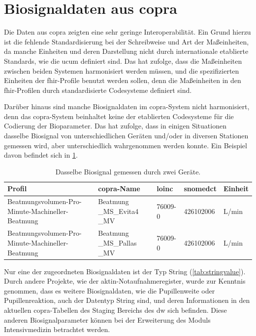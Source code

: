 \section{Biosignaldaten aus \acs{copra}} \label{sec:configvarcopradiscu}

Die Daten aus \ac{copra} zeigten eine sehr geringe Interoperabilität. Ein Grund hierzu ist die fehlende Standardisierung bei der Schreibweise und Art der Maßeinheiten, da manche Einheiten und deren Darstellung nicht durch internationale etablierte Standards, wie die \ac{ucum} definiert sind. Das hat zufolge, dass die Maßeinheiten zwischen beiden Systemen harmonisiert werden müssen, und die spezifizierten Einheiten der \ac{fhir}-Profile benutzt werden sollen, denn die Maßeinheiten in den \ac{fhir}-Profilen durch standardisierte Codesysteme definiert sind. 

Darüber hinaus sind manche Biosignaldaten im \ac{copra}-System nicht harmonisiert, denn das \ac{copra}-System beinhaltet keine der etablierten Codesysteme für die Codierung der Bioparameter. Das hat zufolge, dass in einigen Situationen dasselbe Biosignal von unterschiedlichen Geräten und/oder in diversen Stationen gemessen wird, aber unterschiedlich wahrgenommen werden konnte. Ein Beispiel davon befindet sich in \ref{tab:sameprofilbiosig}.

\clearpage

 \begin{table}[ht]
 	\centering 
 	\caption[Dasselbe Biosignal gemessen durch zwei Geräte]{Dasselbe Biosignal gemessen durch zwei Geräte.}
 	\label{tab:sameprofilbiosig}
 	\begin{tabular}{|p{3.5cm}|p{2.4cm}|l|l|l|}
 		\hline
 		\rowcolor{lightgray} Profil & \ac{copra}-Name & \acs{loinc} & \ac{snomedct} & Einheit \\ \hline
 		Beatmungsvolumen-Pro-Minute-Machineller-Beatmung & Beatmung \_MS\_Evita4 \_MV & 76009-0 & 426102006 & L/min \\ \hline
 		Beatmungsvolumen-Pro-Minute-Machineller-Beatmung & Beatmung \_MS\_Pallas \_MV & 76009-0 & 426102006 & L/min \\ \hline
 	\end{tabular}
 \end{table}

Nur eine der zugeordneten Biosignaldaten ist der Typ String (\ref{tab:stringvalue}). Durch andere Projekte, wie der \ac{aktin}-Notaufnahmeregister, wurde zur Kenntnis genommen, dass es weitere Biosignaldaten, wie die Pupillenweite oder Pupillenreaktion, auch der Datentyp String sind, und deren Informationen in den aktuellen \ac{copra}-Tabellen des Staging Bereichs des \ac{dw} sich befinden. Diese anderen Biosignalparameter können bei der Erweiterung des Moduls \glqq Intensivmedizin\grqq{} betrachtet werden.

